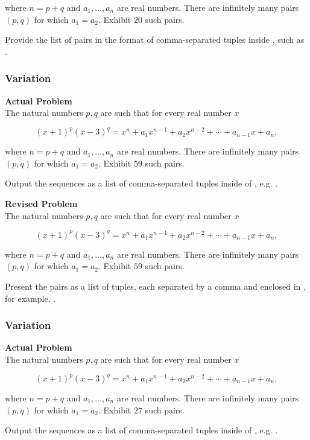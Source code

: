 where $n=p+q$ and $a_{1}, \ldots, a_{n}$ are real numbers. There are infinitely many pairs $(p, q)$ for which $a_{1}=a_{2}$. Exhibit $20$ such pairs.

Provide the list of pairs in the format of comma-separated tuples inside \boxed, such as \boxed{[(2, 19), (3, 123)]}.

\subsubsection{Variation}
\textbf{Actual Problem}\\
The natural numbers $p, q$ are such that for every real number $x$

$$
(x+1)^{p}(x-3)^{q}=x^{n}+a_{1} x^{n-1}+a_{2} x^{n-2}+\cdots+a_{n-1} x+a_{n},
$$

where $n=p+q$ and $a_{1}, \ldots, a_{n}$ are real numbers. There are infinitely many pairs $(p, q)$ for which $a_{1}=a_{2}$. Exhibit $59$ such pairs.

Output the sequences as a list of comma-separated tuples inside of \boxed, e.g. \boxed{[(2, 19), (3, 123)]}.

\textbf{Revised Problem}\\
The natural numbers $p, q$ are such that for every real number $x$

$$
(x+1)^{p}(x-3)^{q}=x^{n}+a_{1} x^{n-1}+a_{2} x^{n-2}+\cdots+a_{n-1} x+a_{n},
$$

where $n=p+q$ and $a_{1}, \ldots, a_{n}$ are real numbers. There are infinitely many pairs $(p, q)$ for which $a_{1}=a_{2}$. Exhibit $59$ such pairs.

Present the pairs as a list of tuples, each separated by a comma and enclosed in \boxed, for example, \boxed{[(2, 19), (3, 123)]}.

\subsubsection{Variation}
\textbf{Actual Problem}\\
The natural numbers $p, q$ are such that for every real number $x$

$$
(x+1)^{p}(x-3)^{q}=x^{n}+a_{1} x^{n-1}+a_{2} x^{n-2}+\cdots+a_{n-1} x+a_{n},
$$

where $n=p+q$ and $a_{1}, \ldots, a_{n}$ are real numbers. There are infinitely many pairs $(p, q)$ for which $a_{1}=a_{2}$. Exhibit $27$ such pairs.

Output the sequences as a list of comma-separated tuples inside of \boxed, e.g. \boxed{[(2, 19), (3, 123)]}.

